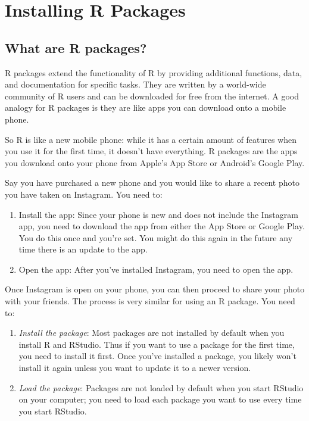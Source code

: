 \documentclass[
]{book}
\providecommand{\tightlist}{%
  \setlength{\itemsep}{0pt}\setlength{\parskip}{0pt}}
\begin{document}
\hypertarget{installing-r-packages}{%
\chapter{Installing R Packages}\label{installing-r-packages}}

\hypertarget{what-are-r-packages}{%
\section{What are R packages?}\label{what-are-r-packages}}

R packages extend the functionality of R by providing additional functions, data, and documentation for specific tasks. They are written by a world-wide community of R users and can be downloaded for free from the internet. A good analogy for R packages is they are like apps you can download onto a mobile phone.

So R is like a new mobile phone: while it has a certain amount of features when you use it for the first time, it doesn't have everything. R packages are the apps you download onto your phone from Apple's App Store or Android's Google Play.

Say you have purchased a new phone and you would like to share a recent photo you have taken on Instagram. You need to:

\begin{enumerate}
\def\labelenumi{\arabic{enumi}.}
\item
  Install the app: Since your phone is new and does not include the Instagram app, you need to download the app from either the App Store or Google Play. You do this once and you're set. You might do this again in the future any time there is an update to the app.
\item
  Open the app: After you've installed Instagram, you need to open the app.
\end{enumerate}

Once Instagram is open on your phone, you can then proceed to share your photo with your friends. The process is very similar for using an R package. You need to:

\begin{enumerate}
\def\labelenumi{\arabic{enumi}.}
\tightlist
\item
  \emph{Install the package}: Most packages are not installed by default when you install R and RStudio. Thus if you want to use a package for the first time, you need to install it first. Once you've installed a package, you likely won't install it again unless you want to update it to a newer version.\\
\item
  \emph{Load the package}: Packages are not loaded by default when you start RStudio on your computer; you need to load each package you want to use every time you start RStudio.
\end{enumerate}
\end{document}
